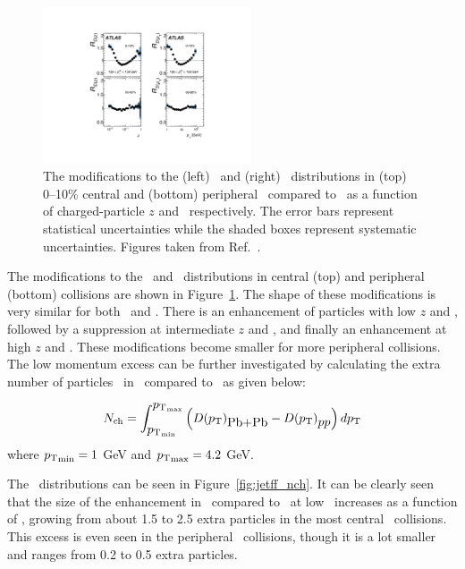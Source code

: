 \begin{figure}[htbp]
\begin{center}
\includegraphics[width=0.55\textwidth]{figures/jetMeasurements/jetff_rdz_rdpt}
\caption{The modifications to the (left) \Dz\ and (right) \Dpt\ distributions in (top) 0--10\% central and (bottom) peripheral \pbpb\ compared to \pp\ as a function of charged-particle $z$ and \pt\ respectively.
The error bars represent statistical uncertainties while the shaded boxes represent systematic uncertainties.
Figures taken from Ref.~\cite{PhysRevC.98.024908}.}
\label{fig:jetff_rdz_rdpt}
\end{center}
\end{figure}

The modifications to the \Dz\ and \Dpt\ distributions in central (top) and peripheral (bottom) collisions are shown in Figure~\ref{fig:jetff_rdz_rdpt}.
The shape of these modifications is very similar for both \Dz\ and \Dpt.
There is an enhancement of particles with low $z$ and \pt, followed by a suppression at intermediate $z$ and \pt, and finally an enhancement at high $z$ and \pt.
These modifications become smaller for more peripheral collisions.
The low momentum excess can be further investigated by calculating the extra number of particles \Nch\ in \pbpb\ compared to \pp\ as given below:

\begin{align}
\mbox{$N_{\mathrm{ch}}$} = \int^{\mbox{$p_{\mathrm{T}}$}_{\mathrm{max}}}_{\mbox{$p_{\mathrm{T}}$}_{\mathrm{min}}} \left( \mbox{$D(\mbox{$p_{\mathrm{T}}$})$}_{\mbox{Pb+Pb}} - \mbox{$D(\mbox{$p_{\mathrm{T}}$})$}_{\mbox{$pp$}} \right) d\mbox{$p_{\mathrm{T}}$}
\end{align}
where $\mbox{$p_{\mathrm{T}}$}_{\mathrm{min}} = 1$ GeV and $\mbox{$p_{\mathrm{T}}$}_{\mathrm{max}} = 4.2$ GeV.

The \Nch\ distributions can be seen in Figure~\ref{fig:jetff_nch}.
It can be clearly seen that the size of the enhancement in \pp\ compared to \pp\ at low \pt\ increases as a function of \ptjet, growing from about 1.5 to 2.5 extra particles in the most central \pbpb\ collisions.
This excess is even seen in the peripheral \pbpb\ collisions, though it is a lot smaller and ranges from 0.2 to 0.5 extra particles.



